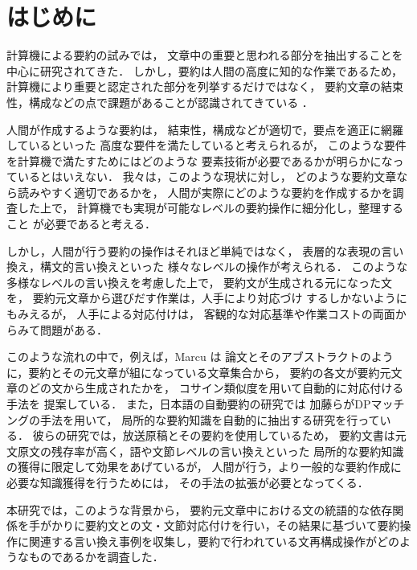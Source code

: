 

\maketitle

\section{はじめに}


計算機による要約の試みでは，
文章中の重要と思われる部分を抽出することを中心に研究されてきた．
しかし，要約は人間の高度に知的な作業であるため，
計算機により重要と認定された部分を列挙するだけではなく，
要約文章の結束性，構成などの点で課題があることが認識されてきている \cite{Namba00,Mani99revise}．

人間が作成するような要約は，
結束性，構成などが適切で，要点を適正に網羅しているといった
高度な要件を満たしていると考えられるが，
このような要件を計算機で満たすためにはどのような
要素技術が必要であるかが明らかになっているとはいえない．
我々は，このような現状に対し，
どのような要約文章なら読みやすく適切であるかを，
人間が実際にどのような要約を作成するかを調査した上で，
計算機でも実現が可能なレベルの要約操作に細分化し，整理すること
が必要であると考える．

しかし，人間が行う要約の操作はそれほど単純ではなく，
表層的な表現の言い換え，構文的言い換えといった
様々なレベルの操作が考えられる．
このような多様なレベルの言い換えを考慮した上で，
要約文が生成される元になった文を，
要約元文章から選びだす作業は，人手により対応づけ
するしかないようにもみえるが，
人手による対応付けは，
客観的な対応基準や作業コストの両面からみて問題がある．

このような流れの中で，例えば，Marcu \cite{MarcuPair} は
論文とそのアブストラクトのように，要約とその元文章が組になっている文章集合から，
要約の各文が要約元文章のどの文から生成されたかを，
コサイン類似度を用いて自動的に対応付ける手法を
提案している．
また，日本語の自動要約の研究では
加藤らがDPマッチングの手法を用いて，
局所的な要約知識を自動的に抽出する研究を行っている\cite{kato99}．
彼らの研究では，放送原稿とその要約を使用しているため，
要約文書は元文原文の残存率が高く，語や文節レベルの言い換えといった
局所的な要約知識の獲得に限定して効果をあげているが，
人間が行う，より一般的な要約作成に必要な知識獲得を行うためには，
その手法の拡張が必要となってくる．

本研究では，このような背景から，
要約元文章中における文の統語的な依存関係を手がかりに要約文との文・文節対応付けを行い，その結果に基づいて要約操作に関連する言い換え事例を収集し，要約で行われている文再構成操作がどのようなものであるかを調査した．

